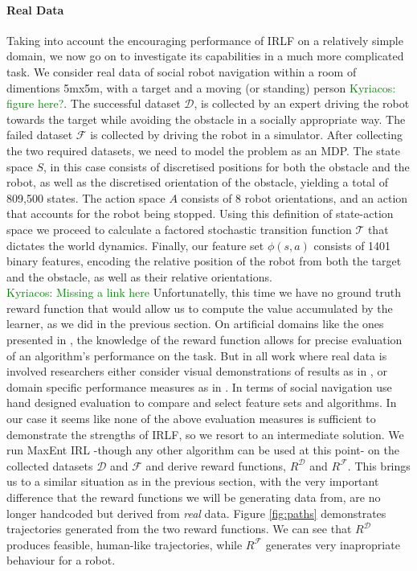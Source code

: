 \documentclass[letterpaper]{article}
\newcommand{\ks}[1]{\textcolor{green}{Kyriacos: #1}}
\newcommand{\ks}[1]{}
\begin{document}
\paragraph{Real Data}
Taking into account the encouraging performance of IRLF on a relatively simple domain, we now go on to investigate its capabilities in a much more complicated task. We consider real data
of social robot navigation within a room of dimentions 5mx5m, with a target and a moving (or standing) person \ks{figure here?}. The successful dataset $\mathcal{D}$, is collected by an expert driving the robot towards the target while avoiding the obstacle in a socially appropriate way. The failed dataset $\mathcal{F}$ is collected by driving the robot in a simulator. After collecting the two required datasets, we need to model the problem as an MDP. The state space $S$, in this case consists of discretised positions for both the obstacle and the robot, as well as the discretised orientation of the obstacle, yielding a total of 809,500 states. The action space $A$ consists of 8 robot orientations, and an action that accounts for the robot being stopped. Using this definition of state-action space we proceed to calculate a factored stochastic transition function $\mathcal{T}$ that dictates the world dynamics. Finally, our feature set $\phi(s,a)$ consists of 1401 binary features, encoding the relative position of the robot from both the target and the obstacle, as well as their relative orientations. \\
\ks{Missing a link here}
Unfortunatelly, this time we have no ground truth reward function that would allow us to compute the value accumulated by the learner, as we did in the previous section. On artificial domains like the ones presented in \cite{levine2011nonlinear}, the knowledge of the reward function allows for precise evaluation of an algorithm's performance on the task. But in all work where real data is involved researchers either consider visual demonstrations of results as in \cite{ratliff2006maximum}, or domain specific performance measures as in \cite{neu2009training}. In terms of social navigation \cite{vasquez2014inverse} use hand designed evaluation to compare and select feature sets and algorithms. In our case it seems like none of the above evaluation measures is sufficient to demonstrate the strengths of IRLF, so we resort to an intermediate solution. We run MaxEnt IRL -though any other algorithm can be used at this point- on the collected datasets $\mathcal{D}$ and $\mathcal{F}$ and derive reward functions, $R^{\mathcal{D}}$ and $R^{\mathcal{F}}$. This brings us to a similar situation as in the previous section, with the very important difference that the reward functions we will be generating data from, are no longer handcoded but derived from \emph{real} data. Figure \ref{fig:paths} demonstrates trajectories generated from the two reward functions. We can see that $R^{\mathcal{D}}$ produces feasible, human-like trajectories, while $R^{\mathcal{F}}$ generates very inapropriate behaviour for a robot.\\
\end{document}
